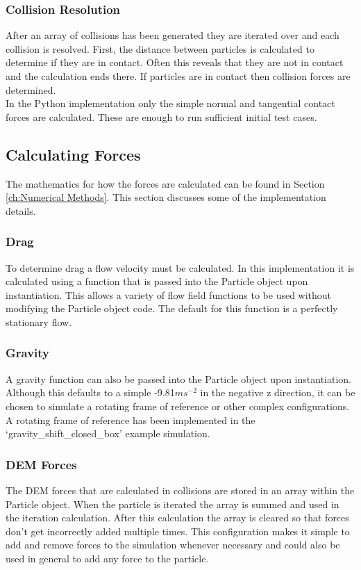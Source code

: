 \documentclass[10pt,a4paper,titlepage]{report}
\begin{document}
\subsubsection{Collision Resolution}
After an array of collisions has been generated they are iterated over and each collision is resolved. First, the distance between particles is calculated to determine if they are in contact. Often this reveals that they are not in contact and the calculation ends there. If particles are in contact then collision forces are determined.
\\In the Python implementation only the simple normal and tangential contact forces are calculated. These are enough to run sufficient initial test cases.
\subsection{Calculating Forces}
The mathematics for how the forces are calculated can be found in Section \ref{ch:Numerical Methods}. This section discusses some of the implementation details.
\subsubsection{Drag}
To determine drag a flow velocity must be calculated. In this implementation it is calculated using a function that is passed into the Particle object upon instantiation. This allows a variety of flow field functions to be used without modifying the Particle object code. The default for this function is a perfectly stationary flow.
\subsubsection{Gravity}
A gravity function can also be passed into the Particle object upon instantiation. Although this defaults to a simple -9.81$ms^{-2}$ in the negative z direction, it can be chosen to simulate a rotating frame of reference or other complex configurations. A rotating frame of reference has been implemented in the `gravity\_shift\_closed\_box' example simulation\cite{DEMApples}.
\subsubsection{DEM Forces}
The DEM forces that are calculated in collisions are stored in an array within the Particle object. When the particle is iterated the array is summed and used in the iteration calculation. After this calculation the array is cleared so that forces don't get incorrectly added multiple times. This configuration makes it simple to add and remove forces to the simulation whenever necessary and could also be used in general to add any force to the particle.
\end{document}
